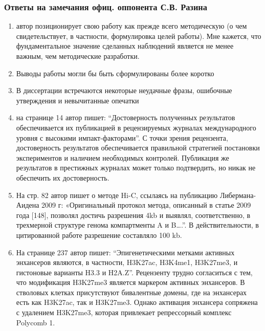\begin{frame}[allowframebreaks]
    \frametitle{Ответы на замечания офиц. оппонента С.В. Разина}
    \begin{enumerate}
        \item автор позиционирует свою работу как прежде всего методическую (о чем свидетельствует, в частности, формулировка целей работы). Мне кажется, что фундаментальное значение сделанных наблюдений является не менее важным, чем методические разработки. 
        \item Выводы работы могли бы быть сформулированы более коротко 
        \item В диссертации встречаются некоторые неудачные фразы, ошибочные утверждения и невычитанные опечатки 
        \item на странице 14 автор пишет: “Достоверность полученных результатов обеспечивается их публикацией в рецензируемых журналах международного уровня с высокими импакт-факторами”. С точки зрения рецензента, достоверность результатов обеспечивается правильной стратегией постановки экспериментов и наличием необходимых контролей. Публикация же результатов в престижных журналах может только подтвердить, но никак не обеспечить их достоверность.
        \item На стр. 82 автор пишет о методе Hi-C, ссылаясь на публикацию Либермана-Аидена 2009 г: «Оригинальный протокол метода, описанный в статье 2009 года [148], позволял достичь разрешения 4kb и выявлял, соответственно, в трехмерной структуре генома компартменты A и B….”. В действительности, в цитированной работе разрешение составляло 100 kb. 
        \item На странице 237 автор пишет: “Эпигенетическими метками активных энхансеров являются, в частности, H3K27ac, H3K4me1, H3K27me3, и гистоновые варианты H3.3 и H2A.Z”. Рецензенту трудно согласиться с тем, что модификация H3K27me3 является маркером активных энхансеров. В стволовых клетках присутствуют бивалентные домены, где на энхансерах есть как H3K27ac, так и H3K27me3. Однако активация энхансера сопряжена с удалением H3K27me3, которая привлекает репрессорный комплекс Polycomb 1.
    \end{enumerate}
\end{frame}

